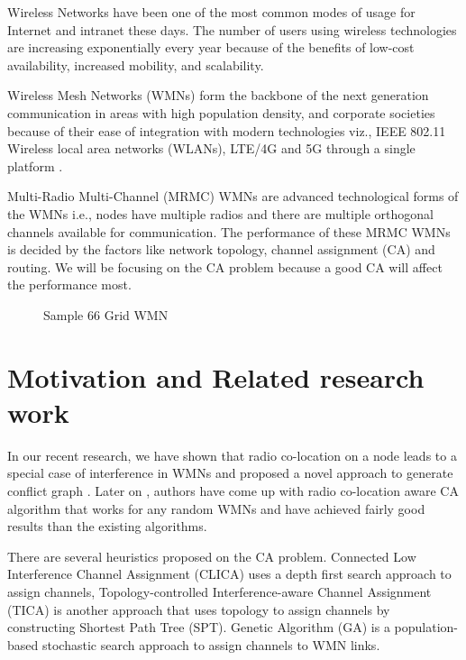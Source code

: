 \documentclass[conference]{IEEEtran}
\begin{document}
Wireless Networks have been one of the most common modes of usage for Internet and intranet these days. 
The number of users using wireless technologies are increasing exponentially every year because of the benefits of low-cost availability, increased mobility, and scalability.

Wireless Mesh Networks (WMNs) form the backbone of the next generation communication in areas with high population density, and corporate societies
because of their ease of integration with modern technologies viz., IEEE 802.11 Wireless local area networks (WLANs), LTE/4G and 5G through a single platform \cite{12Capone}. 

Multi-Radio Multi-Channel (MRMC) WMNs are advanced technological forms of the WMNs i.e., nodes have multiple radios  and there are multiple orthogonal channels available  for communication.
The performance of these MRMC WMNs is decided by the factors like network topology, channel assignment (CA) and routing.
We will be focusing on the CA problem because a good CA will affect the performance most.

\begin{figure}
  \centering {\texttt{[image: 6x6ne]}}
    \caption{Sample 66 Grid WMN }
     \label{sample}
\end{figure} 

\section{Motivation and Related research work}
In our recent research, we have shown that radio co-location on a node leads to a special case of interference in WMNs 
and proposed  a novel approach to generate conflict graph \cite{kala2016interference}. 
Later on \cite{kala2015radio},  authors have come up with radio co-location aware CA algorithm  that works for any random WMNs 
and have achieved fairly good results than the existing algorithms. 

There are several heuristics proposed on the CA problem.  
Connected Low Interference Channel Assignment (CLICA) \cite{marina2010topology} uses a depth first search approach
to assign channels,
Topology-controlled Interference-aware Channel Assignment (TICA) \cite{chaudhry2012improving} is another approach that 
uses topology to assign channels by constructing Shortest Path Tree (SPT).
Genetic Algorithm (GA) \cite{sridhar2009channel} is a population-based stochastic search approach to assign channels to WMN links.
\end{document}
